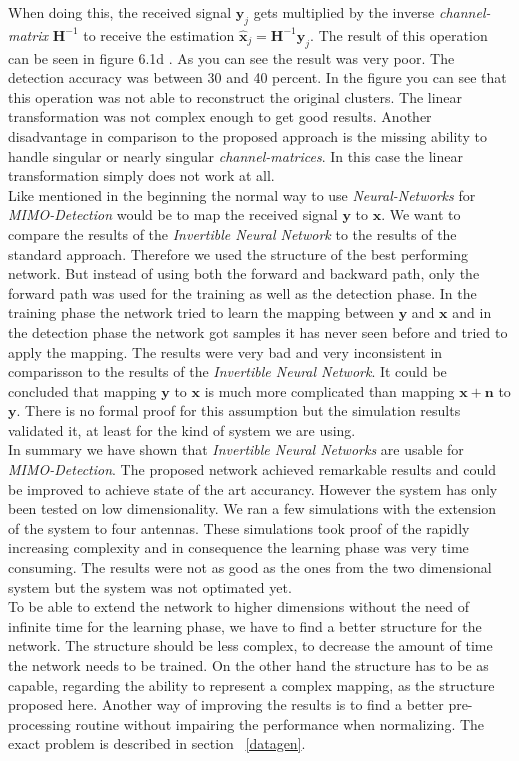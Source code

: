 \documentclass[oneside]{msvreport}%
\newcommand{\B}[1]{\boldsymbol{#1}}
\newcommand{\Bhat}[1]{\boldsymbol{\hat{#1}}}
\newcommand{\e}[1]{\emph{#1}}
\begin{document}
\noindent When doing this, the received signal $\B{y}_j$ gets multiplied by the inverse \e{channel-matrix} $\B{H}^{-1}$ to receive the estimation $\Bhat{x}_j = \B{H}^{-1}\B{y}_j$. The result of this operation can be seen in figure 6.1d . As you can see the result was very poor. The detection accuracy was between 30 and 40 percent. In the figure you can see that this operation was not able to reconstruct the original clusters. The linear transformation was not complex enough to get good results. Another disadvantage in comparison to the proposed approach is the missing ability to handle singular or nearly singular \e{channel-matrices}. In this case the linear transformation simply does not work at all.\\

\noindent Like mentioned in the beginning the normal way to use \e{Neural-Networks} for \e{MIMO-Detection} would be to map the received signal $\B{y}$ to $\B{x}$. We want to compare the results of the \e{Invertible Neural Network} to the results of the standard approach. Therefore we used the structure of the best performing network. But instead of using both the forward and backward path, only the forward path was used for the training as well as the detection phase. In the training phase the network tried to learn the mapping between $\B{y}$ and $\B{x}$ and in the detection phase the network got samples it has never seen before and tried to apply the mapping. The results were very bad and very inconsistent in comparisson to the results of the \e{Invertible Neural Network}. It could be concluded that mapping $\B{y}$ to $\B{x}$ is much more complicated than mapping $\B{x} + \B{n}$ to $\B{y}$. There is no formal proof for this assumption but the simulation results validated it, at least for the kind of system we are using.\\

\noindent In summary we have shown that \e{Invertible Neural Networks} are usable for \e{MIMO-Detection}. The proposed network achieved remarkable results and could be improved to achieve state of the art accurancy. However the system has only been tested on low dimensionality. We ran a few simulations with the extension of the system to four antennas. These simulations took proof of the rapidly increasing complexity and in consequence the learning phase was very time consuming. The results were not as good as the ones from the two dimensional system but the system was not optimated yet. \\ To be able to extend the network to higher dimensions without the need of infinite time for the learning phase, we have to find a better structure for the network. The structure should be less complex, to decrease the amount of time the network needs to be trained. On the other hand the structure has to be as capable, regarding the ability to represent a complex mapping, as the structure proposed here. Another way of improving the results is to find a better pre-processing routine without impairing the performance when normalizing. The exact problem is described in section ~\ref{datagen}.\\
\end{document}

